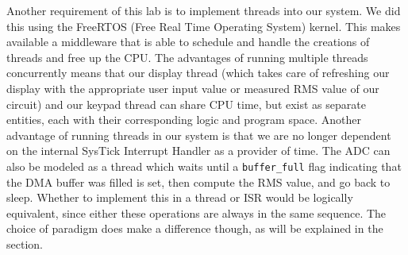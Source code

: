 Another requirement of this lab is to implement threads into our system. We did this using the FreeRTOS (Free Real Time Operating System) kernel. This makes available a middleware that is able to schedule and handle the creations of threads and free up the CPU. The advantages of running multiple threads concurrently means that our display thread (which takes care of refreshing our display with the appropriate user input value or measured RMS value of our circuit) and our keypad thread can share CPU time, but exist as separate entities, each with their corresponding logic and program space. Another advantage of running threads in our system is that we are no longer dependent on the internal SysTick Interrupt Handler as a provider of time. 
The ADC can also be modeled as a thread which waits until a \verb|buffer_full| flag indicating that the DMA buffer was filled is set, then compute the RMS value, and go back to sleep. Whether to implement this in a thread or ISR would be logically equivalent, since either these operations are always in the same sequence. The choice of paradigm does make a difference though, as will be explained in the  section.

 